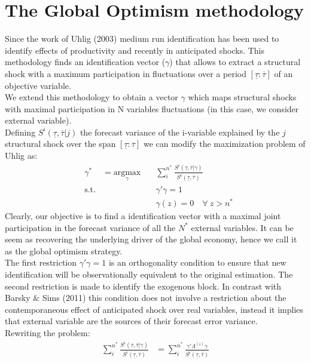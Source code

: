 \documentclass[12pt, a4paper]{article}
\begin{document}
\section{The Global Optimism methodology}
Since the work of Uhlig (2003) medium run identification has been used to identify effects of productivity and recently in anticipated shocks. This methodology finds an identification vector ($\gamma$) that allows to extract a structural shock with a maximum participation in fluctuations over a period $[\underline{\tau}:\overline{\tau}]$ of an objective variable. \\
We extend this methodology to obtain a vector $\gamma$ which maps structural shocks with maximal participation in N variables fluctuations (in this case, we consider external variable). \\
Defining $S^{i}(\underline{\tau},\overline{\tau}|j)$ the forecast variance of the i-variable explained by the $j$ structural shock over the span $[\underline{\tau}:\overline{\tau}]$ we can modify the maximization problem of Uhlig as:
\begin{equation*}
\begin{aligned}
& \gamma^* &= \underset{\gamma}{\text{argmax}}  \quad
&  \sum_i^{n^*}\frac{S^{i}(\underline{\tau},\overline{\tau}|\gamma)}{S^{i}(\underline{\tau},\overline{\tau})} \\
& \text{s.t.}
&  & \gamma' \gamma = 1 \\
&  & & \gamma(z)  = 0 \quad \forall \ z>n^*
\end{aligned}
\end{equation*}
Clearly, our objective is to find a identification vector with a maximal joint participation  in the forecast variance of all the $N^*$ external variables. It can be seem as recovering the underlying driver of the global economy, hence we call it as the global optimism strategy.\\
The first restriction $\gamma' \gamma = 1$ is an orthogonality condition to ensure that new identification will be observationally equivalent to the original estimation. The second restriction is made to identify the exogenous block. In contrast with Barsky \& Sims (2011) this condition does not involve a restriction about the contemporaneous effect of anticipated shock over real variables, instead it implies that external variable are the sources of their forecast error variance.\\
Rewriting the problem:
\begin{equation*}
\begin{aligned}
\sum_i^{n^*}\frac{S^{i}(\underline{\tau},\overline{\tau}|\gamma)}{S^{i}(\underline{\tau},\overline{\tau})}
 &=  \sum_i^{n^*}\frac{\gamma' \Lambda^{(i)} \gamma}{S^{i}(\underline{\tau},\overline{\tau})}
\end{aligned}
\end{equation*}
\end{document}
